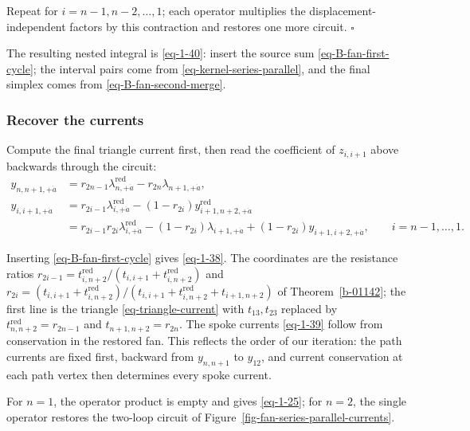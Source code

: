\documentclass[11pt]{article}
\numberwithin{equation}{section}
\numberwithin{figure}{section}
\numberwithin{table}{section}
\begin{document}
\begin{proofbox}
Repeat for $i=n-1,n-2,\ldots,1$; each operator multiplies the displacement-independent factors by this contraction and restores one more circuit. $\square$
\end{proofbox}

The resulting nested integral is \eqref{eq-1-40}: insert the source sum \eqref{eq-B-fan-first-cycle}; the interval pairs come from \eqref{eq-kernel-series-parallel}, and the final simplex comes from \eqref{eq-B-fan-second-merge}.

\subsubsection{Recover the currents}\label{local-B4-y-heading}

Compute the final triangle current first, then read the coefficient of $z_{i,i+1}$ above backwards through the circuit:
\begin{equation}\label{eq-B-fan-general-fractions}
\begin{aligned}
y_{n,n+1,+\dot a}
&=r_{2n-1}\lambda_{n,+\dot a}^{\mathrm{red}}-r_{2n}\lambda_{n+1,+\dot a},\\
y_{i,i+1,+\dot a}
&=r_{2i-1}\lambda_{i,+\dot a}^{\mathrm{red}}-(1-r_{2i})y_{i+1,n+2,+\dot a}^{\mathrm{red}}\\
&=r_{2i-1}r_{2i}\lambda_{i,+\dot a}^{\mathrm{red}}
-(1-r_{2i})\lambda_{i+1,+\dot a}+(1-r_{2i})y_{i+1,i+2,+\dot a},\qquad i=n-1,\ldots,1.
\end{aligned}
\end{equation}

Inserting \eqref{eq-B-fan-first-cycle} gives \eqref{eq-1-38}. The coordinates are the resistance ratios $r_{2i-1}=t^{\mathrm{red}}_{i,n+2}/(t_{i,i+1}+t^{\mathrm{red}}_{i,n+2})$ and $r_{2i}=(t_{i,i+1}+t^{\mathrm{red}}_{i,n+2})/(t_{i,i+1}+t^{\mathrm{red}}_{i,n+2}+t_{i+1,n+2})$ of Theorem~\ref{b-01142}; the first line is the triangle \eqref{eq-triangle-current} with $t_{13},t_{23}$ replaced by $t^{\mathrm{red}}_{n,n+2}=r_{2n-1}$ and $t_{n+1,n+2}=r_{2n}$. The spoke currents \eqref{eq-1-39} follow from conservation in the restored fan. This reflects the order of our iteration: the path currents are fixed first, backward from $y_{n,n+1}$ to $y_{12}$, and current conservation at each path vertex then determines every spoke current.

For $n=1$, the operator product is empty and gives \eqref{eq-1-25}; for $n=2$, the single operator restores the two-loop circuit of Figure~\ref{fig-fan-series-parallel-currents}.
\end{document}
